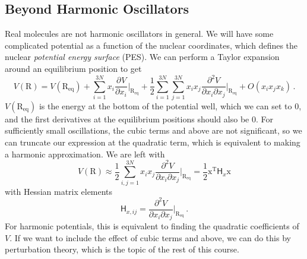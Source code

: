 \documentclass{article}
\theoremstyle{plain}\theoremheaderfont{\normalfont\itshape}\theorembodyfont{\rmfamily}\theoremseparator{.}\newtheorem*{rem}{Remark}\newtheorem*{ex}{Example}\newtheorem*{proof}{Proof}\newtheorem*{altp}{Alternative proof}
\theoremstyle{plain}\theoremheaderfont{\normalfont\bfseries}\theorembodyfont{\rmfamily}\theoremseparator{.}\newtheorem{thm}{Theorem}[section]\newtheorem{lem}[thm]{Lemma}\newtheorem{prop}[thm]{Proposition}\newtheorem*{cor}{Corollary}\newtheorem{defn}[thm]{Definition}\newtheorem{clm}[thm]{Claim}\newtheorem{clminproof}{Claim}
\theoremstyle{break}\theoremheaderfont{\normalfont\itshape}\theorembodyfont{\rmfamily}\theoremseparator{.\medskip}\newtheorem*{proofskip}{Proof}\newtheorem*{exs}{Examples}\newtheorem*{rems}{Remarks}
\theoremstyle{break}\theoremheaderfont{\normalfont\bfseries}\theorembodyfont{\rmfamily}\theoremseparator{.\medskip}\newtheorem{lemskip}[thm]{Lemma}\newtheorem{defnskip}[thm]{Definition}\newtheorem{propskip}[thm]{Proposition}\newtheorem{thmskip}[thm]{Theorem}
\numberwithin{equation}{section}
\newcommand{\tp}{^\mathrm{T}}
\newcommand{\pdv}[3][]{\frac{\partial^{#1} #2}{{\partial #3}^{#1}}}
\newcommand{\vb}[1]{\bm{\mathrm{#1}}}
\begin{document}
    \begin{figure}[ht!]
        \centering
    \end{figure}

    \subsection{Beyond Harmonic Oscillators}
    Real molecules are not harmonic oscillators in general. We will have some complicated potential as a function of the nuclear coordinates, which defines the nuclear \textit{potential energy surface} (PES). We can perform a Taylor expansion around an equilibrium position to get
    \begin{equation}
        V(\vb{R})=V(\vb{R}_{\text{eq}})+\sum_{i=1}^{3N}x_i\pdv{V}{x_i}\bigg|_{\vb{R}_{\text{eq}}}+\frac{1}{2}\sum_{i=1}^{3N}\sum_{j=1}^{3N}x_ix_j\frac{\partial^2 V}{\partial x_i\partial x_j}\bigg|_{\vb{R}_{\text{eq}}}+O(x_ix_jx_k)\,.
    \end{equation}
    \(V(\vb{R}_{\text{eq}})\) is the energy at the bottom of the potential well, which we can set to 0, and the first derivatives at the equilibrium positions should also be 0. For sufficiently small oscillations, the cubic terms and above are not significant, so we can truncate our expression at the quadratic term, which is equivalent to making a harmonic approximation. We are left with
    \begin{equation}\label{harmonic_approximation}
        V(\vb{R})\approx\frac{1}{2}\sum_{i,j=1}^{3N}x_ix_j\frac{\partial^2 V}{\partial x_i\partial x_j}\bigg|_{\vb{R}_{\text{eq}}}=\frac{1}{2}\vb{x}\tp\mathsf{H}_x\vb{x}
    \end{equation}
    with Hessian matrix elements
    \begin{equation}
        \mathsf{H}_{x,ij}=\frac{\partial^2 V}{\partial x_i\partial x_j}\bigg|_{\vb{R}_{\text{eq}}}\,.
    \end{equation}
    For harmonic potentials, this is equivalent to finding the quadratic coefficients of \(V\). If we want to include the effect of cubic terms and above, we can do this by perturbation theory, which is the topic of the rest of this course.
\end{document}
